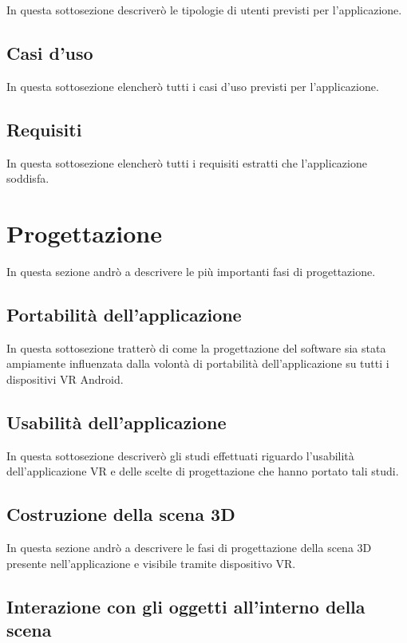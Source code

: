 In questa sottosezione descriverò le tipologie di utenti previsti per l'applicazione.

\subsection{Casi d'uso}

In questa sottosezione elencherò tutti i casi d'uso previsti per l'applicazione.

\subsection{Requisiti}

In questa sottosezione elencherò tutti i requisiti estratti che l'applicazione soddisfa.

\section{Progettazione}

In questa sezione andrò a descrivere le più importanti fasi di progettazione.

\subsection{Portabilità dell'applicazione}

In questa sottosezione tratterò di come la progettazione del software sia stata ampiamente influenzata dalla volontà di portabilità dell'applicazione su tutti i dispositivi VR Android.

\subsection{Usabilità dell'applicazione}

In questa sottosezione descriverò gli studi effettuati riguardo l'usabilità dell'applicazione VR e delle scelte di progettazione che hanno portato tali studi.

\subsection{Costruzione della scena 3D}

In questa sezione andrò a descrivere le fasi di progettazione della scena 3D presente nell'applicazione e visibile tramite dispositivo VR.

\subsection{Interazione con gli oggetti all'interno della scena} 

